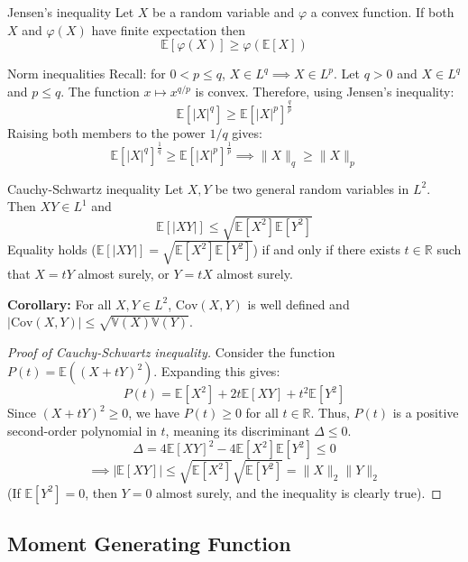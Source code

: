 \documentclass[11pt, a4paper]{article}
\begin{document}
\begin{proposition}{Jensen's inequality}{}
Let $X$ be a random variable and $\varphi$ a convex function. If both $X$ and $\varphi(X)$ have finite expectation then
\[ \mathbb{E}[\varphi(X)] \ge \varphi(\mathbb{E}[X]) \]
\end{proposition}

\begin{example}{Norm inequalities}{}
Recall: for $0 < p \le q$, $X \in L^q \implies X \in L^p$. Let $q > 0$ and $X \in L^q$ and $p \le q$. The function $x \mapsto x^{q/p}$ is convex. Therefore, using Jensen's inequality:
\[ \mathbb{E}[|X|^q] \ge \mathbb{E}[|X|^p]^{\frac{q}{p}} \]
Raising both members to the power $1/q$ gives:
\[ \mathbb{E}[|X|^q]^{\frac{1}{q}} \ge \mathbb{E}[|X|^p]^{\frac{1}{p}} \implies \|X\|_q \ge \|X\|_p \]
\end{example}

\begin{proposition}{Cauchy-Schwartz inequality}{}
Let $X, Y$ be two general random variables in $L^2$. Then $XY \in L^1$ and
\[ \mathbb{E}[|XY|] \le \sqrt{\mathbb{E}[X^2]\mathbb{E}[Y^2]} \]
Equality holds ($\mathbb{E}[|XY|] = \sqrt{\mathbb{E}[X^2]\mathbb{E}[Y^2]}$) if and only if there exists $t \in \mathbb{R}$ such that $X = tY$ almost surely, or $Y = tX$ almost surely.

\textbf{Corollary:} For all $X, Y \in L^2$, $\text{Cov}(X,Y)$ is well defined and $|\text{Cov}(X,Y)| \le \sqrt{\mathbb{V}(X)\mathbb{V}(Y)}$.
\end{proposition}

\begin{proof}[Proof of Cauchy-Schwartz inequality]
Consider the function $P(t) = \mathbb{E}((X + tY)^2)$. Expanding this gives:
\[ P(t) = \mathbb{E}[X^2] + 2t\mathbb{E}[XY] + t^2\mathbb{E}[Y^2] \]
Since $(X + tY)^2 \ge 0$, we have $P(t) \ge 0$ for all $t \in \mathbb{R}$. Thus, $P(t)$ is a positive second-order polynomial in $t$, meaning its discriminant $\Delta \le 0$.
\[ \Delta = 4\mathbb{E}[XY]^2 - 4\mathbb{E}[X^2]\mathbb{E}[Y^2] \le 0 \]
\[ \implies |\mathbb{E}[XY]| \le \sqrt{\mathbb{E}[X^2]}\sqrt{\mathbb{E}[Y^2]} = \|X\|_2 \|Y\|_2 \]
(If $\mathbb{E}[Y^2] = 0$, then $Y=0$ almost surely, and the inequality is clearly true).
\end{proof}

\subsection{Moment Generating Function}
\end{document}
